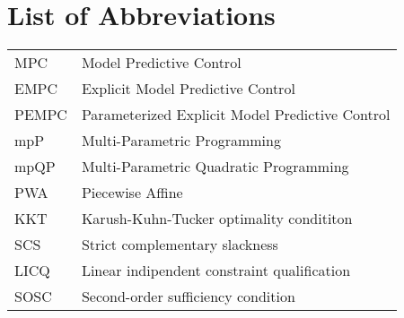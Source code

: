 
\begingroup 
\let\clearpage\relax
\let\cleardoublepage\relax
\let\cleardoublepage\relax

\chapter*{List of Abbreviations} 
\vspace{-.5em} %
\begin{tabular}{@{} p{\figurelabelwidth} @{} p{\textwidth-\figurelabelwidth}}
MPC & Model Predictive Control\\
EMPC & Explicit Model Predictive Control\\
PEMPC & Parameterized Explicit Model Predictive Control\\
mpP & Multi-Parametric Programming\\
mpQP & Multi-Parametric Quadratic Programming\\
PWA & Piecewise Affine\\
KKT & Karush-Kuhn-Tucker optimality condititon\\
SCS & Strict complementary slackness\\
LICQ & Linear indipendent constraint qualification\\
SOSC & Second-order sufficiency condition
\end{tabular}                   
\endgroup
\cleardoublepage